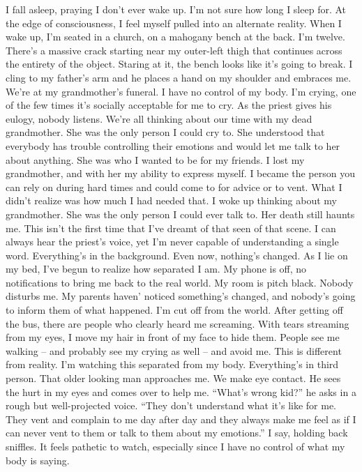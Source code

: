 \documentclass[a4paper, 12pt]{book}
\newcommand\tab[1][1cm]{\hspace*{#1}}
\begin{document}
\newline
\tab
I fall asleep, praying I don’t ever wake up. I’m not sure how long I sleep for. At the edge of consciousness, I feel myself pulled into an alternate reality. When I wake up, I’m seated in a church, on a mahogany bench at the back. I’m twelve. There’s a massive crack starting near my outer-left thigh that continues across the entirety of the object. Staring at it, the bench looks like it’s going to break. I cling to my father’s arm and he places a hand on my shoulder and embraces me. We’re at my grandmother’s funeral.
\newline
\tab
I have no control of my body. I’m crying, one of the few times it’s socially acceptable for me to cry. As the priest gives his eulogy, nobody listens. We’re all thinking about our time with my dead grandmother. She was the only person I could cry to. She understood that everybody has trouble controlling their emotions and would let me talk to her about anything. She was who I wanted to be for my friends. I lost my grandmother, and with her my ability to express myself. I became the person you can rely on during hard times and could come to for advice or to vent. What I didn’t realize was how much I had needed that.
\newline
\tab
I woke up thinking about my grandmother. She was the only person I could ever talk to. Her death still haunts me. This isn’t the first time that I’ve dreamt of that seen of that scene. I can always hear the priest’s voice, yet I’m never capable of understanding a single word. Everything’s in the background. Even now, nothing’s changed. As I lie on my bed, I’ve begun to realize how separated I am. My phone is off, no notifications to bring me back to the real world. My room is pitch black. Nobody disturbs me. My parents haven’ noticed something’s changed, and nobody’s going to inform them of what happened. I’m cut off from the world.
\newline
\tab
After getting off the bus, there are people who clearly heard me screaming. With tears streaming from my eyes, I move my hair in front of my face to hide them. People see me walking -- and probably see my crying as well -- and avoid me. This is different from reality. I’m watching this separated from my body. Everything’s in third person. That older looking man approaches me. We make eye contact. He sees the hurt in my eyes and comes over to help me. ``What’s wrong kid?'' he asks in a rough but well-projected voice.
\newline
\tab
``They don’t understand what it’s like for me. They vent and complain to me day after day and they always make me feel as if I can never vent to them or talk to them about my emotions.'' I say, holding back sniffles. It feels pathetic to watch, especially since I have no control of what my body is saying.
\end{document}
